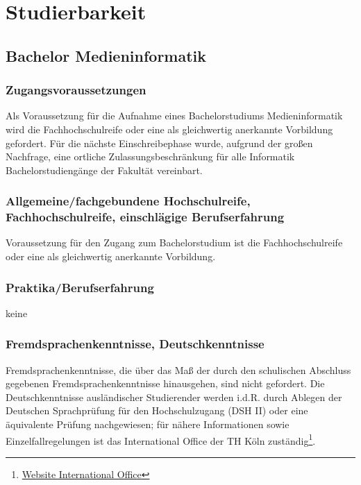 \chapter{Studierbarkeit}\label{studierbarkeit}

\section{Bachelor
Medieninformatik}\label{bachelor-medieninformatik-1}

\subsection{Zugangsvoraussetzungen}\label{zugangsvoraussetzungen}

Als Voraussetzung für die Aufnahme eines Bachelorstudiums
Medieninformatik wird die Fachhochschulreife oder eine als gleichwertig
anerkannte Vorbildung gefordert. Für die nächste Einschreibephase wurde,
aufgrund der großen Nachfrage, eine ortliche Zulassungsbeschränkung für
alle Informatik Bachelorstudiengänge der Fakultät vereinbart.

\subsection{Allgemeine/fachgebundene Hochschulreife,
Fachhochschulreife, einschlägige
Berufserfahrung}\label{allgemeinefachgebundene-hochschulreife-fachhochschulreife-einschluxe4gige-berufserfahrung}

Voraussetzung für den Zugang zum Bachelorstudium ist die
Fachhochschulreife oder eine als gleichwertig anerkannte Vorbildung.

\subsection{Praktika/Berufserfahrung}\label{praktikaberufserfahrung}

keine

\subsection{Fremdsprachenkenntnisse,
Deutschkenntnisse}\label{fremdsprachenkenntnisse-deutschkenntnisse}

Fremdsprachenkenntnisse, die über das Maß der durch den schulischen
Abschluss gegebenen Fremdsprachenkenntnisse hinausgehen, sind nicht
gefordert. Die Deutschkenntnisse ausländischer Studierender werden
i.d.R. durch Ablegen der Deutschen Sprachprüfung für den Hochschulzugang
(DSH II) oder eine äquivalente Prüfung nachgewiesen; für nähere
Informationen sowie Einzelfallregelungen ist das International Office
der TH Köln zuständig\footnote{\href{https://www.th-koeln.de/internationales/international-office_1986.php}{Website
  International Office}}.

